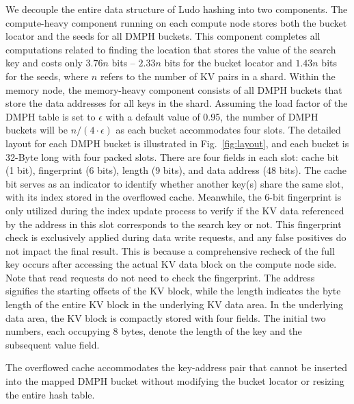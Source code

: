 We decouple the entire data structure of Ludo hashing into two components. The compute-heavy component running on each compute node stores both the bucket locator and the seeds for all DMPH buckets. 
This component completes all computations related to finding the location that stores the value of the search key and costs only $3.76n$ bits -- $2.33n$ bits for the bucket locator and $1.43n$ bits for the seeds, where $n$ refers to the number of KV pairs in a shard.
Within the memory node, the memory-heavy component consists of all DMPH buckets that store the data addresses for all keys in the shard. Assuming the load factor of the DMPH table is set to $\epsilon$ with a default value of 0.95, the number of DMPH buckets will be $n/(4\cdot\epsilon)$ as each bucket accommodates four slots. 
The detailed layout for each DMPH bucket is illustrated in Fig.~\ref{fig:layout}, and each bucket is 32-Byte long with four packed slots. 
There are four fields in each slot: cache bit (1 bit), fingerprint (6 bits), length (9 bits), and data address (48 bits). 
The cache bit serves as an indicator to identify whether another key(s) share the same slot, with its index stored in the overflowed cache. 
Meanwhile, the 6-bit fingerprint is only utilized during the index update process to verify if the KV data referenced by the address in this slot corresponds to the search key or not. This fingerprint check is exclusively applied during data write requests, and any false positives do not impact the final result. This is because a comprehensive recheck of the full key occurs after accessing the actual KV data block on the compute node side.
Note that read requests do not need to check the fingerprint. 
The address signifies the starting offsets of the KV block, while the length indicates the byte length of the entire KV block in the underlying KV data area.
In the underlying data area, the KV block is compactly stored with four fields. The initial two numbers, each occupying 8 bytes, denote the length of the key and the subsequent value field.

The overflowed cache accommodates the key-address pair that cannot be inserted into the mapped DMPH bucket without modifying the bucket locator or resizing the entire hash table.

